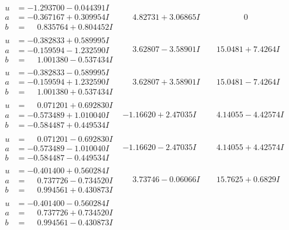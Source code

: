 \documentclass[1p]{elsarticle_modified}
\theoremstyle{definition}
\begin{document}
$$\begin{array}{c|c|c}
\begin{aligned}
u &= -1.293700 - 0.044391 I \\
a &= -0.367167 + 0.309954 I \\
b &= \phantom{-}0.835764 + 0.804452 I\end{aligned}
 & \phantom{-}4.82731 + 3.06865 I & \phantom{-0.000000 } 0 \\ \hline\begin{aligned}
u &= -0.382833 + 0.589995 I \\
a &= -0.159594 - 1.232590 I \\
b &= \phantom{-}1.001380 - 0.537434 I\end{aligned}
 & \phantom{-}3.62807 - 3.58901 I & \phantom{-}15.0481 + 7.4264 I \\ \hline\begin{aligned}
u &= -0.382833 - 0.589995 I \\
a &= -0.159594 + 1.232590 I \\
b &= \phantom{-}1.001380 + 0.537434 I\end{aligned}
 & \phantom{-}3.62807 + 3.58901 I & \phantom{-}15.0481 - 7.4264 I \\ \hline\begin{aligned}
u &= \phantom{-}0.071201 + 0.692830 I \\
a &= -0.573489 + 1.010040 I \\
b &= -0.584487 + 0.449534 I\end{aligned}
 & -1.16620 + 2.47035 I & \phantom{-}4.14055 - 4.42574 I \\ \hline\begin{aligned}
u &= \phantom{-}0.071201 - 0.692830 I \\
a &= -0.573489 - 1.010040 I \\
b &= -0.584487 - 0.449534 I\end{aligned}
 & -1.16620 - 2.47035 I & \phantom{-}4.14055 + 4.42574 I \\ \hline\begin{aligned}
u &= -0.401400 + 0.560284 I \\
a &= \phantom{-}0.737726 - 0.734520 I \\
b &= \phantom{-}0.994561 + 0.430873 I\end{aligned}
 & \phantom{-}3.73746 - 0.06066 I & \phantom{-}15.7625 + 0.6829 I \\ \hline\begin{aligned}
u &= -0.401400 - 0.560284 I \\
a &= \phantom{-}0.737726 + 0.734520 I \\
b &= \phantom{-}0.994561 - 0.430873 I\end{aligned}

\end{array}$$
\end{document}
